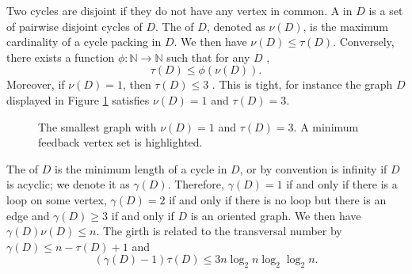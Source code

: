 \documentclass[a4paper, 11pt]{book}
\newcommand{\ARCOMM}[1]{\noindent \textcolor{red}{\textbf{AR:} #1 $\clubsuit$}}
\numberwithin{equation}{section}
\theoremstyle{plain}
\newcommand{\feedback}{\tau}
\newcommand{\girth}{\gamma}
\newcommand{\packing}{\nu}
\renewcommand{\(}{\ldbrack}
\renewcommand{\)}{\rdbrack}
\newcommand{\BF}[1]{{\bf\boldmath{#1}\unboldmath}}
\begin{document}
Two cycles are disjoint if they do not have any vertex in common. A \BF{cycle packing} in $D$ is a set of pairwise disjoint cycles of $D$. The \BF{packing number} of $D$, denoted as $\packing(D)$, is the maximum cardinality of a cycle packing in $D$. We then have
$\packing(D) \le \feedback(D)$. Conversely, there exists a function $\phi : \mathbb{N} \to \mathbb{N}$ such that for any $D$ \cite{RRST96},
\begin{equation} \label{eq:feedback<phi(packing)}
	\feedback(D) \le \phi(\packing(D)).
\end{equation}
Moreover, if $\packing(D) = 1$, then $\feedback(D) \le 3$ \cite{McC91}. This is tight, for instance the graph $D$ displayed in Figure \ref{fig:nu=1_tau=3} satisfies $\packing(D) = 1$ and $\feedback(D) = 3$.

\begin{figure}
\centering
{}
\caption{%
The smallest graph with $\packing(D) = 1$ and $\tau(D) = 3$. A minimum feedback vertex set is highlighted.} \label{fig:nu=1_tau=3}
\end{figure}

The \BF{girth} of $D$ is the minimum length of a cycle in $D$, or by convention is infinity if $D$ is acyclic; we denote it as $\girth(D)$. Therefore, $\girth(D) = 1$ if and only if there is a loop on some vertex, $\girth(D) = 2$ if and only if there is no loop but there is an edge and $\girth(D) \ge 3$ if and only if $D$ is an oriented graph. We then have
$\girth(D) \packing(D) \le n$. The girth is related to the transversal number by $\gamma(D) \le n - \feedback(D) + 1$ and \cite{KLMR13}
\[
	(\girth(D) - 1) \feedback(D) \le 3 n \log_2 n \log_2 \log_2 n.
\]
\end{document}
